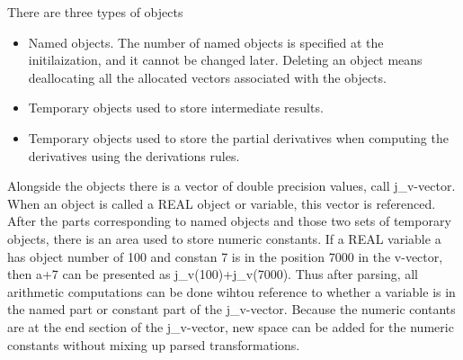 There are three types of objects
\begin{itemize}
\item Named objects. The number of named objects is specified at the initilaization,
and it cannot be changed later. Deleting an object means deallocating all the allocated
vectors associated with the objects.
\item Temporary objects used to store intermediate results.
\item Temporary objects used to store the partial derivatives when computing the derivatives using
the derivations rules.
\end{itemize}

Alongside the objects there is a vector of double precision values, call j\_v-vector. When an object is called a REAL
object or variable, this vector is referenced. After the parts corresponding to named objects and
those two sets of temporary objects, there is an area used to store numeric constants. If a REAL
variable a has object number of 100 and constan 7 is in the  position 7000 in the v-vector,
then a+7 can be presented as j\_v(100)+j\_v(7000). Thus after parsing, all arithmetic computations can be done wihtou reference to whether
a variable is in the named part or constant part of the j\_v-vector.
Because the numeric contants are at the end section of the j\_v-vector,
new space can be added for the numeric
constants without mixing up parsed transformations.
